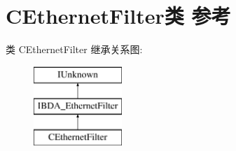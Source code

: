\hypertarget{class_c_ethernet_filter}{}\section{C\+Ethernet\+Filter类 参考}
\label{class_c_ethernet_filter}
类 C\+Ethernet\+Filter 继承关系图\+:\begin{figure}[H]
\begin{center}
\leavevmode
\includegraphics[height=3.000000cm]{class_c_ethernet_filter}
\end{center}
\end{figure}
